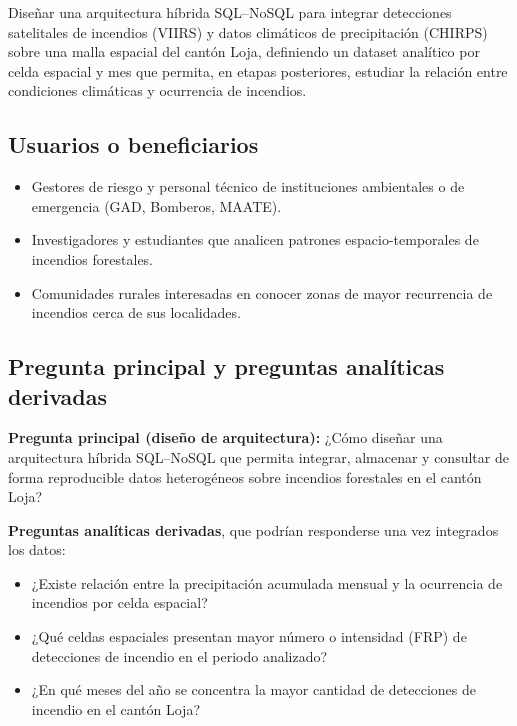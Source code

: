 \documentclass[11pt,a4paper]{article}
\begin{document}
Dise\~nar una arquitectura h\'ibrida SQL--NoSQL para integrar detecciones satelitales de incendios (VIIRS) y datos clim\'aticos de precipitaci\'on (CHIRPS) sobre una malla espacial del cant\'on Loja, definiendo un dataset anal\'itico por celda espacial y mes que permita, en etapas posteriores, estudiar la relaci\'on entre condiciones clim\'aticas y ocurrencia de incendios.

\subsection{Usuarios o beneficiarios}

\begin{itemize}
    \item Gestores de riesgo y personal t\'ecnico de instituciones ambientales o de emergencia (GAD, Bomberos, MAATE).
    \item Investigadores y estudiantes que analicen patrones espacio-temporales de incendios forestales.
    \item Comunidades rurales interesadas en conocer zonas de mayor recurrencia de incendios cerca de sus localidades.
\end{itemize}

\subsection{Pregunta principal y preguntas anal\'iticas derivadas}

\textbf{Pregunta principal (dise\~no de arquitectura):} ¿C\'omo dise\~nar una arquitectura h\'ibrida SQL--NoSQL que permita integrar, almacenar y consultar de forma reproducible datos heterog\'eneos sobre incendios forestales en el cant\'on Loja?

\textbf{Preguntas anal\'iticas derivadas}, que podr\'ian responderse una vez integrados los datos:
\begin{itemize}
    \item ¿Existe relaci\'on entre la precipitaci\'on acumulada mensual y la ocurrencia de incendios por celda espacial?
    \item ¿Qu\'e celdas espaciales presentan mayor n\'umero o intensidad (FRP) de detecciones de incendio en el periodo analizado?
    \item ¿En qu\'e meses del a\~no se concentra la mayor cantidad de detecciones de incendio en el cant\'on Loja?
\end{itemize}

\end{document}
